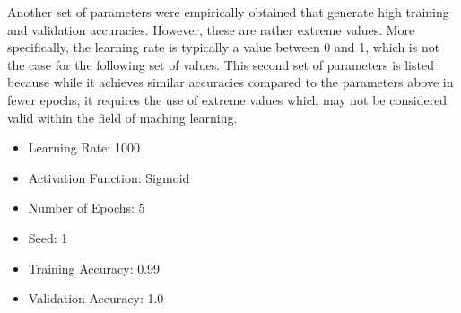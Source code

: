 \documentclass{article}
\begin{document}
Another set of parameters were empirically obtained that generate high
training and validation accuracies. However, these are rather extreme values.
More specifically, the learning rate is typically a value between 0 and 1,
which is not the case for the following set of values. This second set of parameters
is listed because while it achieves similar accuracies compared to the parameters
above in fewer epochs, it requires the use of extreme values which may not be
considered valid within the field of maching learning.
\begin{itemize}
  \item Learning Rate: 1000
  \item Activation Function: Sigmoid
  \item Number of Epochs: 5
  \item Seed: 1
  \item Training Accuracy: 0.99
  \item Validation Accuracy: 1.0
\end{itemize}



\end{document}
